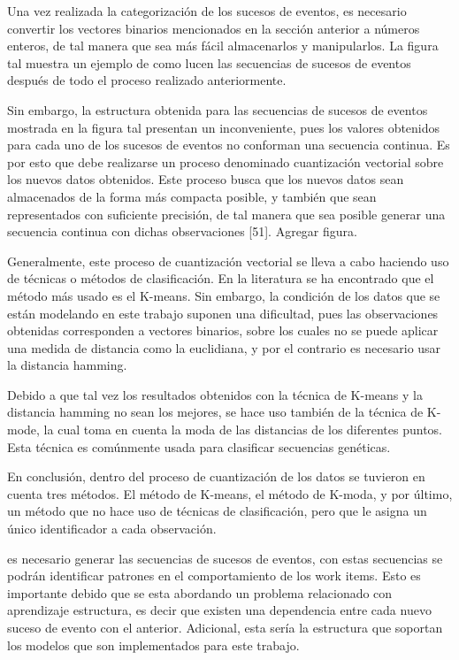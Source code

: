 Una vez realizada la categorización de los sucesos de eventos, es necesario convertir los vectores binarios mencionados en la sección anterior a números enteros, de tal manera que sea más fácil almacenarlos y manipularlos. La figura tal muestra un ejemplo de como lucen las secuencias de sucesos de eventos después de todo el proceso realizado anteriormente. 

Sin embargo, la estructura obtenida para las secuencias de sucesos de eventos mostrada en la figura tal presentan un inconveniente, pues los valores obtenidos para cada uno de los sucesos de eventos no conforman una secuencia continua. Es por esto que debe realizarse un proceso denominado cuantización vectorial sobre los nuevos datos obtenidos. Este proceso busca que los nuevos datos sean almacenados de la forma más compacta posible, y también que sean representados con suficiente precisión, de tal manera que sea posible generar una secuencia continua con dichas observaciones [51]. Agregar figura. 

Generalmente, este proceso de cuantización vectorial se lleva a cabo haciendo uso de técnicas o métodos de clasificación. En la literatura se ha encontrado que el método más usado es el K-means. Sin embargo, la condición de los datos que se están modelando en este trabajo suponen una dificultad, pues las observaciones obtenidas corresponden a vectores binarios, sobre los cuales no se puede aplicar una medida de distancia como la euclidiana, y por el contrario es necesario usar la distancia hamming. 

Debido a que tal vez los resultados obtenidos con la técnica de K-means y la distancia hamming no sean los mejores, se hace uso también de la técnica de K-mode, la cual toma en cuenta la moda de las distancias de los diferentes puntos. Esta técnica es comúnmente usada para clasificar secuencias genéticas.   

En conclusión, dentro del proceso de cuantización de los datos se tuvieron en cuenta tres métodos. El método de K-means, el método de K-moda, y por último, un método que no hace uso de técnicas de clasificación, pero que le asigna un único identificador a cada observación.


es necesario generar las secuencias de sucesos de eventos, con estas secuencias se podrán identificar patrones en el comportamiento de los work items. Esto es importante debido que se esta abordando un problema relacionado con aprendizaje estructura, es decir que existen una dependencia entre cada nuevo suceso de evento con el anterior. Adicional, esta sería la estructura que soportan los modelos que son implementados para este trabajo.

